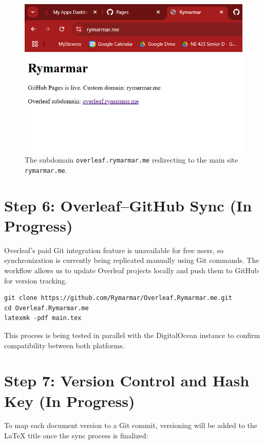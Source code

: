 \begin{figure}[h!]
    \centering
    \includegraphics[width=\textwidth]{png/DomainNames/overleaf_redirect.png}
    \caption{The subdomain \texttt{overleaf.rymarmar.me} redirecting to the main site \texttt{rymarmar.me}.}
\end{figure}

\section{Step 6: Overleaf–GitHub Sync (In Progress)}
Overleaf’s paid Git integration feature is unavailable for free users, so synchronization is currently being replicated manually using Git commands.  
The workflow allows us to update Overleaf projects locally and push them to GitHub for version tracking.

\begin{verbatim}
git clone https://github.com/Rymarmar/Overleaf.Rymarmar.me.git
cd Overleaf.Rymarmar.me
latexmk -pdf main.tex
\end{verbatim}

This process is being tested in parallel with the DigitalOcean instance to confirm compatibility between both platforms.

\section{Step 7: Version Control and Hash Key (In Progress)}
To map each document version to a Git commit, versioning will be added to the LaTeX title once the sync process is finalized:

